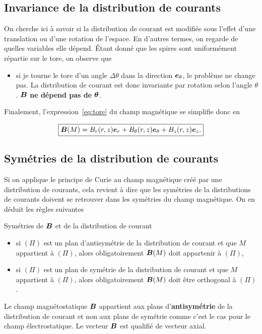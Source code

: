 \subsection{Invariance de la distribution de courants}
On cherche ici à savoir si la distribution de courant est modifiée sous l'effet
d'une translation ou d'une rotation de l'espace. En d'autres termes, on regarde
de quelles variables elle dépend. Étant donné que les spires sont uniformément
répartie sur le tore, on observe que

\begin{itemize}
	\item  si je tourne le tore d'un angle $\Delta \theta$ dans la
	  direction $\etheta$, le problème
	  ne change pas. La distribution de courant est donc invariante 
	  par rotation selon l'angle $\theta$. $\vecb$ \textbf{ne dépend pas de
	  $\mitbf{\theta}$}.
\end{itemize}

Finalement, l'expression~\ref{eq:tore} du champ magnétique se simplifie donc en 

\begin{equation*}
	\boxed{\vecb(M) = B_r(r,z)\er + B_\theta(r,z)\etheta + B_z(r,z)\ez.}
\end{equation*}
\subsection{Symétries de la distribution de courants}

Si on applique le principe de Curie au champ magnétique créé par une distribution 
de courants, cela revient à dire que les symétries de la distributions de 
courants doivent se retrouver dans les symétries du champ magnétique. On en 
déduit les règles suivantes

\begin{defn}{Symétries de $\vecb$ et de la distribution de courant}
\begin{itemize}
  \item si $(\Pi)$ est un plan d'antisymétrie de la distribution de courant et que 
    $M$ appartient à $(\Pi)$, alors obligatoirement $\vecb(M)$ doit 
    appartenir à $(\Pi)$,
  \item si $(\Pi)$ est un plan de symétrie de la distribution de courant 
    et que $M$ appartient à $(\Pi)$, alors obligatoirement $\vecb(M)$ doit 
    être orthogonal à $(\Pi)$.
\end{itemize}
\end{defn}

\begin{rema}
	Le champ magnétostatique $\vecb$ appartient aux plans d'\textbf{antisymétrie}
	de la distribution de courant et non aux plans de symétrie comme
	c'est le cas pour le champ électrostatique. Le vecteur $\vecb$ est 
	qualifié de vecteur axial.
\end{rema}

